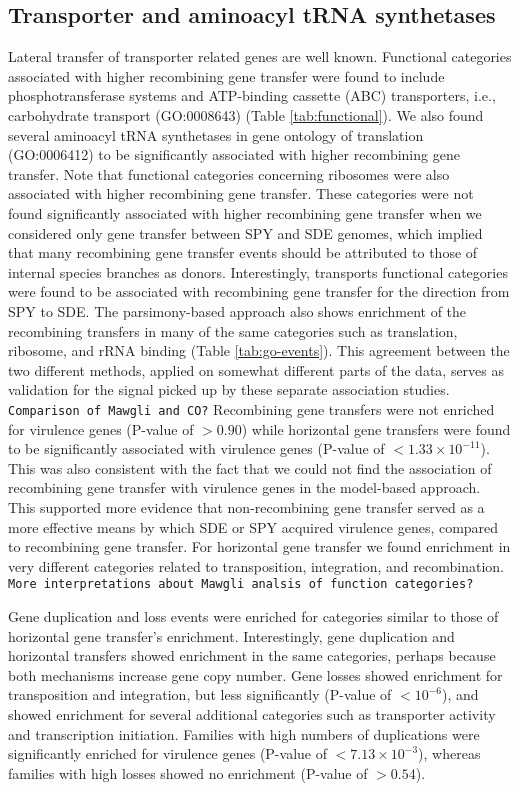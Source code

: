 \documentclass[english]{article}
\begin{document}
\subsection{Transporter and aminoacyl tRNA synthetases}
Lateral transfer of transporter related genes are well known.  Functional
categories associated with higher recombining gene transfer were found to
include phosphotransferase systems and ATP-binding cassette (ABC) transporters,
i.e., carbohydrate transport (GO:0008643) (Table \ref{tab:functional}).  We also
found several aminoacyl tRNA synthetases in gene ontology of translation
(GO:0006412) to be significantly associated with higher recombining gene
transfer.  Note that functional categories concerning ribosomes were also
associated with higher recombining gene transfer. These categories were not
found significantly associated with higher recombining gene transfer when we
considered only gene transfer between SPY and SDE genomes, which implied that
many recombining gene transfer events should be attributed to those of internal
species branches as donors.  Interestingly, transports functional categories
were found to be associated with recombining gene transfer for the direction
from SPY to SDE.  The parsimony-based approach also  shows enrichment of the
recombining transfers in many of the same categories such as translation,
ribosome, and rRNA binding (Table \ref{tab:go-events}).  This agreement between
the two different methods, applied on somewhat different parts of the data,
serves as validation for the signal picked up by these separate association
studies.  
\texttt{Comparison of Mawgli and CO?}
Recombining gene transfers were not enriched for virulence genes (P-value of $>0.90$)
while horizontal gene transfers were found to be significantly associated with
virulence genes (P-value of $<1.33 \times 10^{-11}$). This was also consistent
with the fact that we could not find the association of recombining gene
transfer with virulence genes in the model-based approach.
This supported more evidence
that non-recombining gene transfer served as a more effective means by
which SDE or SPY acquired virulence genes, compared to recombining
gene transfer.
For horizontal gene transfer we found enrichment in very different 
categories related to
transposition, integration, and recombination.  
\texttt{More interpretations about Mawgli analsis of function categories?}

Gene duplication and loss events were enriched for categories similar to those
of horizontal gene transfer's enrichment.  Interestingly, gene duplication and
horizontal transfers showed enrichment in the same categories, perhaps because
both mechanisms increase gene copy number.  Gene losses showed enrichment
for transposition and integration, but less significantly (P-value of
$<10^{-6}$), and showed enrichment for several additional categories such as
transporter activity and transcription initiation.  Families with high numbers
of duplications were significantly enriched for virulence genes (P-value of
$<7.13 \times 10^{-3}$), whereas families with high losses showed no enrichment
(P-value of $>0.54$). 
\end{document}
